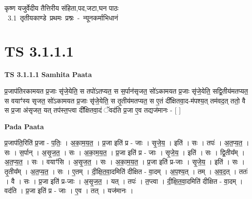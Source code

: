 \documentclass[17pt]{extarticle}
\begin{document}
\begin{titlepage}
    \begin{center}
 
\begin{sanskrit}
    { \Huge
    कृष्ण यजुर्वेदीय तैत्तिरीय संहिता,पद,जटा,घन पाठः 
    }
    \\
    \vspace{2.5cm}
    \mbox{ \Huge
    3.1     तृतीयकाण्डे प्रथमः प्रश्नः - न्यूनकर्माभिधानं   }
\end{sanskrit}
\end{center}

\end{titlepage}
\tableofcontents
\pagebreak

\section*{ TS 3.1.1.1 }

\textbf{TS 3.1.1.1 } \newline
\textbf{Samhita Paata} \newline

प्र॒जाप॑तिरकामयत प्र॒जाः सृ॑जे॒येति॒ स तपो॑ऽतप्यत॒ स स॒र्पान॑सृजत॒ सो॑ऽकामयत प्र॒जाः सृ॑जे॒येति॒ सद्वि॒तीय॑मतप्यत॒ स वयाꣳ॑स्य सृजत॒ सो॑ऽकामयत प्र॒जाः सृ॑जे॒येति॒ स तृ॒तीय॑मतप्यत॒ स ए॒तं दी᳚क्षितवा॒द-म॑पश्य॒त् तम॑वद॒त् ततो॒ वै स प्र॒जा अ॑सृजत॒ यत् तप॑स्त॒प्त्वा दी᳚क्षितवा॒दं ॅवद॑ति प्र॒जा ए॒व तद्यज॑मानः - [  ] \newline

\textbf{Pada Paata} \newline

प्र॒जाप॑ति॒रिति॑ प्र॒जा - प॒तिः॒ । अ॒का॒म॒य॒त॒ । प्र॒जा इति॑ प्र - जाः । सृ॒जे॒य॒ । इति॑ । सः । तपः॑ । अ॒त॒प्य॒त॒ । सः । स॒र्पान् । अ॒सृ॒ज॒त॒ । सः । अ॒का॒म॒य॒त॒ । प्र॒जा इति॑ प्र - जाः । सृ॒जे॒य॒ । इति॑ । सः । द्वि॒तीय᳚म् । अ॒त॒प्य॒त॒ । सः । वयाꣳ॑सि । अ॒सृ॒ज॒त॒ । सः । अ॒का॒म॒य॒त॒ । प्र॒जा इति॑ प्र-जाः । सृ॒जे॒य॒ । इति॑ । सः । तृ॒तीय᳚म् । अ॒त॒प्य॒त॒ । सः । ए॒तम् । दी॒क्षि॒त॒वा॒दमिति॑ दीक्षित - वा॒दम् । अ॒प॒श्य॒त् । तम् । अ॒व॒द॒त् । ततः॑ । वै । सः । प्र॒जा इति॑ प्र-जाः । अ॒सृ॒ज॒त॒ । यत् । तपः॑ । त॒प्त्वा । दी॒क्षि॒त॒वा॒दमिति॑ दीक्षित - वा॒दम् । वद॑ति । प्र॒जा इति॑ प्र - जाः । ए॒व । तत् । यज॑मानः ।  \newline




\end{document}
